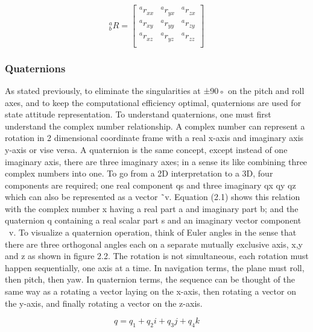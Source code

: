 \begin{equation}
    \textrm{$_{b}^{a}R$}
    =
    \begin{bmatrix}
        \textrm{$^{a}r_{xx}$} & \textrm{$^{a}r_{yx}$} & \textrm{$^{a}r_{zx}$} \\
        \textrm{$^{a}r_{xy}$} & \textrm{$^{a}r_{yy}$} & \textrm{$^{a}r_{zy}$} \\
        \textrm{$^{a}r_{xz}$} & \textrm{$^{a}r_{yz}$} & \textrm{$^{a}r_{zz}$} \\
    \end{bmatrix}
\end{equation}

\subsubsection{Quaternions}

As stated previously, to eliminate the singularities at ±90◦ on the pitch and roll axes, and
to keep the computational efficiency optimal, quaternions are used for state attitude representation. To understand quaternions, one must first understand the complex number
relationship. A complex number can represent a rotation in 2 dimensional coordinate frame
with a real x-axis and imaginary axis y-axis or vise versa.
A quaternion is the same concept, except instead of one imaginary axis, there are three
imaginary axes; in a sense its like combining three complex numbers into one. To go from a
2D interpretation to a 3D, four components are required; one real component qs and three
imaginary qx qy qz which can also be represented as a vector ˜v. Equation (2.1) shows this
relation with the complex number x having a real part a and imaginary part b; and the
quaternion q containing a real scalar part s and an imaginary vector component ~v.
To visualize a quaternion operation, think of Euler angles in the sense that there are
three orthogonal angles each on a separate mutually exclusive axis, x,y and z as shown in
figure 2.2. The rotation is not simultaneous, each rotation must happen sequentially, one
axis at a time. In navigation terms, the plane must roll, then pitch, then yaw. In quaternion
terms, the sequence can be thought of the same way as a rotating a vector laying on the
x-axis, then rotating a vector on the y-axis, and finally rotating a vector on the z-axis.

\begin{equation}
    q = q_1 + q_2 i + q_3 j + q_4 k
\end{equation}

